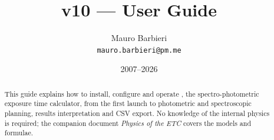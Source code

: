 \documentclass[11pt, a4paper]{article}
\title{\spetc{} v10 --- User Guide}
\author{Mauro Barbieri\\\small\texttt{mauro.barbieri@pm.me}}
\date{2007--2026}
\begin{document}
\maketitle

\begin{abstract}
This guide explains how to install, configure and operate \spetc{}, the
spectro-photometric exposure time calculator, from the first launch to
photometric and spectroscopic planning, results interpretation and CSV
export. No knowledge of the internal physics is required; the companion
document \emph{Physics of the ETC} covers the models and formulae.
\end{abstract}

\tableofcontents









\end{document}
